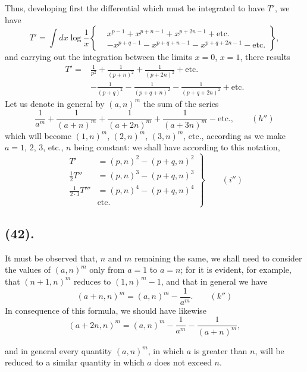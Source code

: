 \documentclass{article}
\begin{document}
Thus, developing first the differential which must be integrated to have $T'$, we have
\[ T'=\int dx\log\frac{1}{x}\left\{\begin{aligned} &x^{p-1}+x^{p+n-1}+x^{p+2n-1}+\text{etc.}\\ &-x^{p+q-1}-x^{p+q+n-1}-x^{p+q+2n-1}-\text{etc.} \end{aligned}\right\}, \]
and carrying out the integration between the limits $x=0$, $x=1$, there results
\[ \begin{aligned} T'={}&\frac{1}{p^{2}}+\frac{1}{(p+n)^{2}}+\frac{1}{(p+2n)^{2}}+\text{etc.}\\ &-\frac{1}{(p+q)^{2}}-\frac{1}{(p+q+n)^{2}}-\frac{1}{(p+q+2n)^{2}}+\text{etc.} \end{aligned} \]
Let us denote in general by $(a,n)^{m}$ the sum of the series
\[ \frac{1}{a^{m}}+\frac{1}{(a+n)^{m}}+\frac{1}{(a+2n)^{m}}+\frac{1}{(a+3n)^{m}}-\text{etc.},\qquad(h'') \]
which will become $(1,n)^{m}$, $(2,n)^{m}$, $(3,n)^{m}$, etc., according as we make $a=1$, $2$, $3$, etc., $n$ being constant: we shall have according to this notation,
\[ \left.\begin{aligned} T'&=(p,n)^{2}-(p+q,n)^{2}\\ \tfrac{1}{2}T''&=(p,n)^{3}-(p+q,n)^{3}\\ \tfrac{1}{2\cdot 3}T'''&=(p,n)^{4}-(p+q,n)^{4}\\ &\text{etc.} \end{aligned}\right\}\qquad(i'') \]

\subsection*{(42).}

It must be observed that, $n$ and $m$ remaining the same, we shall need to consider the values of $(a,n)^{m}$ only from $a=1$ to $a=n$; for it is evident, for example, that $(n+1,n)^{m}$ reduces to $(1,n)^{m}-1$, and that in general we have
\[ (a+n,n)^{m}=(a,n)^{m}-\frac{1}{a^{m}}.\qquad(k'') \]
In consequence of this formula, we should have likewise
\[ (a+2n,n)^{m}=(a,n)^{m}-\frac{1}{a^{m}}-\frac{1}{(a+n)^{m}}, \]

and in general every quantity $(a,n)^{m}$, in which $a$ is greater than $n$, will be reduced to a similar quantity in which $a$ does not exceed $n$.
\end{document}
